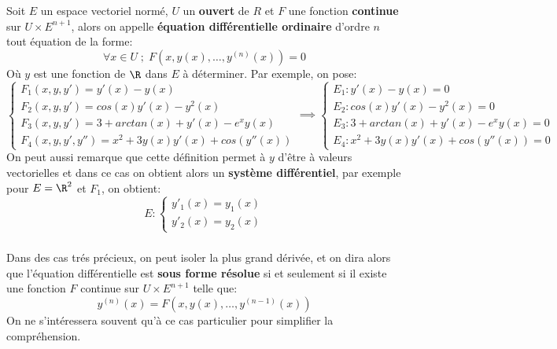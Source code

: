 \chapter*{}
Soit \(E\) un espace vectoriel normé, \(U\) un \textbf{ouvert} de \(R\) et \(F\) une fonction \textbf{continue} sur \(U \times E^{n+1}\), alors on appelle \textbf{équation différentielle ordinaire} d'ordre \(n\) tout équation de la forme:
\[
   \forall x \in U \; ; \; F(x, y(x), \ldots, y^{(n)}(x)) = 0
\]
Où \(y\) est une fonction de \(\R\) dans \(E\) à déterminer. Par exemple, on pose:
\[
   \begin{cases}
      F_1(x, y, y') = y'(x) - y(x)\\
      F_2(x, y, y') = cos(x)y'(x) - y^2(x)\\
      F_3(x, y, y') = 3 + arctan(x) + y'(x) - e^xy(x)\\ 
      F_4(x, y, y', y'') = x^2 + 3y(x)y'(x) + cos(y''(x))
   \end{cases} \implies
   \begin{cases}
      E_1 : y'(x) - y(x) = 0 \\
      E_2 : cos(x)y'(x) - y^2(x) = 0 \\
      E_3 : 3 + arctan(x) + y'(x) - e^xy(x) = 0 \\
      E_4 : x^2 + 3y(x)y'(x) + cos(y''(x)) = 0
   \end{cases}
\]
On peut aussi remarque que cette définition permet à \(y\) d'être à valeurs vectorielles et dans ce cas on obtient alors un \textbf{système différentiel}, par exemple pour \(E = \R^2\) et \(F_1\), on obtient:
\[
   E : \begin{cases}
      y'_1(x) = y_1(x)\\
      y'_2(x) = y_2(x)
   \end{cases}
\]
\subsection*{}
Dans des cas trés précieux, on peut isoler la plus grand dérivée, et on dira alors que l'équation différentielle est \textbf{sous forme résolue} si et seulement si il existe une fonction \(F\) continue sur \(U \times E^{n+1}\) telle que:
\[
   y^{(n)}(x) = F(x, y(x), \ldots, y^{(n-1)}(x))
\]
On ne s'intéressera souvent qu'à ce cas particulier pour simplifier la compréhension.
